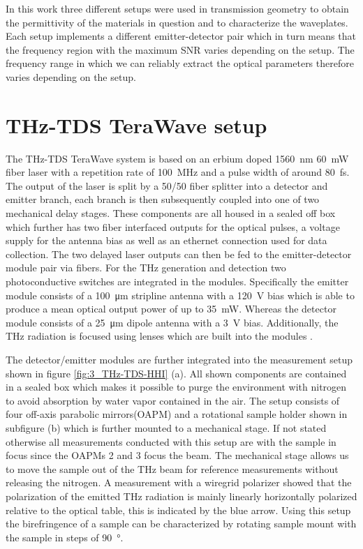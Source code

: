 
In this work three different setups were used in transmission geometry to obtain the permittivity of the materials in question and to characterize the waveplates. Each setup implements a different emitter-detector pair which in turn means that the frequency region with the maximum SNR varies depending on the setup. The frequency range in which we can reliably extract the optical parameters therefore varies depending on the setup. 

\section{THz-TDS TeraWave setup}
The THz-TDS TeraWave system is based on an erbium doped \SI{1560}{\nano \meter} \SI{60}{\milli \watt} fiber laser with a repetition rate of \SI{100}{\mega \hertz} and a pulse width of around \SI{80}{\femto \second}. The output of the laser is split by a 50/50 fiber splitter into a detector and emitter branch, each branch is then subsequently coupled into one of two mechanical delay stages. These components are all housed in a sealed off box which further has two fiber interfaced outputs for the optical pulses, a voltage supply for the antenna bias as well as an ethernet connection used for data collection. The two delayed laser outputs can then be fed to the emitter-detector module pair via fibers. For the THz generation and detection two photoconductive  switches are integrated in the modules. Specifically the emitter module consists of a \SI{100}{\micro \meter} stripline antenna with a \SI{+120}{\volt} bias which is able to produce a mean optical output power of up to \SI{35}{\milli \watt}. Whereas the detector module consists of a \SI{25}{\micro \meter} dipole antenna with a \SI{3}{\volt} bias. Additionally, the THz radiation is focused using  lenses which are built into the modules \cite{Vieweg2014}.

The detector/emitter modules are further integrated into the measurement setup shown in figure \ref{fig:3_THz-TDS-HHI} (a). All shown components are contained in a sealed box which makes it possible to purge the environment with nitrogen to avoid absorption by water vapor contained in the air. The setup consists of four off-axis parabolic mirrors(OAPM) and a rotational sample holder shown in subfigure (b) which is further mounted to a mechanical stage. If not stated otherwise all measurements conducted with this setup are with the sample in focus since the OAPMs 2 and 3 focus the beam. The mechanical stage allows us to move the sample out of the THz beam for reference measurements without releasing the nitrogen. A measurement with a wiregrid polarizer showed that the polarization of the emitted THz radiation is mainly linearly horizontally polarized relative to the optical table, this is indicated by the blue arrow. Using this setup the birefringence of a sample can be characterized by rotating sample mount with the sample in steps of \SI{90}{\degree}.

